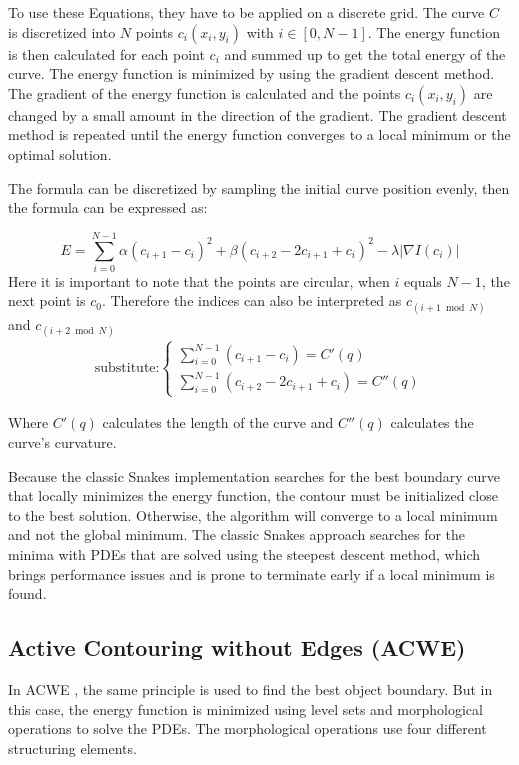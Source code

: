 To use these Equations, they have to be applied on a discrete grid. The curve $C$ is discretized into $N$ points  $c_i(x_i,y_i)$ with $i \in [0, N-1]$. The energy function is then calculated for each point $c_i$ and summed up to get the total energy of the curve. The energy function is minimized by using the gradient descent method. The gradient of the energy function is calculated and the points $c_i(x_i,y_i)$ are changed by a small amount in the direction of the gradient. The gradient descent method is repeated until the energy function converges to a local minimum or the optimal solution. 

The formula can be discretized by sampling the initial curve position evenly, then the formula can be expressed as: 

\begin{equation}
    E = \sum_{i=0}^{N-1} \alpha (c_{i+1} - c_i)^2 + \beta (c_{i+2} - 2c_{i+1} + c_i)^2 - \lambda |\nabla I (c_i)|
\end{equation}
Here it is important to note that the points are circular, when $i$ equals $N-1$, the next point is $c_0$. Therefore the indices can also be interpreted as $c_{(i+1 \bmod N)}$ and $c_{(i+2 \bmod N)}$
\begin{align*}
    \text {substitute:} \begin{cases}
    \sum_{i=0}^{N-1}(c_{i+1} - c_i) = C'(q) \\
    \sum_{i=0}^{N-1}(c_{i+2} - 2c_{i+1} + c_i) = C''(q)
    \end{cases}
\end{align*}

Where $C'(q)$ calculates the length of the curve and $C''(q)$ calculates the curve's curvature.  

Because the classic Snakes implementation searches for the best boundary curve that locally minimizes the energy function, the contour must be initialized close to the best solution. Otherwise, the algorithm will converge to a local minimum and not the global minimum. The classic Snakes approach searches for the minima with PDEs that are solved using the steepest descent method, which brings performance issues and is prone to terminate early if a local minimum is found. 

\subsection{Active Contouring without Edges (ACWE) }
\label{sus:acwe}
In ACWE \cite{vondracek_image_2018}, the same principle is used to find the best object boundary. But in this case, the energy function is minimized using level sets and morphological operations to solve the PDEs. The morphological operations use four different structuring elements. 

